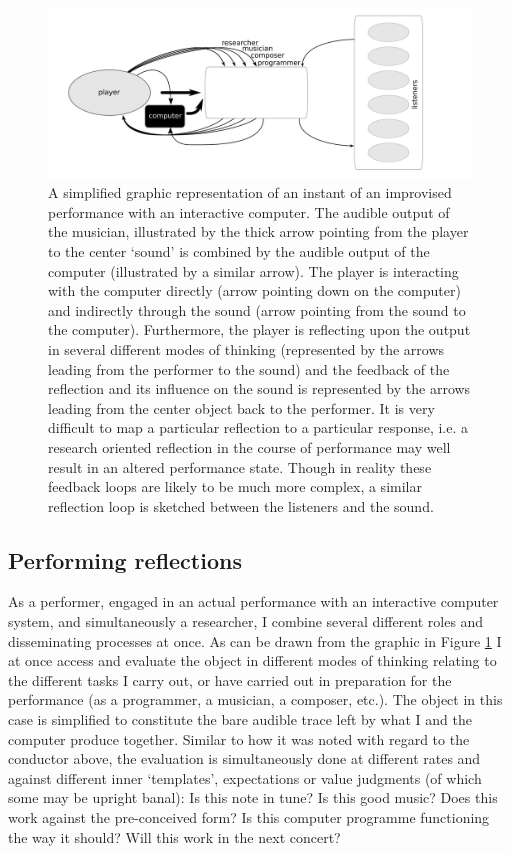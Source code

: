 \begin{figure}[htb]
  \centering
  \includegraphics[width=\linewidth]{img/player-computer}
  \caption{\small{A simplified graphic representation of an instant of an improvised performance with an interactive computer. The audible output of the musician, illustrated by the thick arrow pointing from the player to the center `sound' is combined by the audible output of the computer (illustrated by a similar arrow). The player is interacting with the computer directly (arrow pointing down on the computer) and indirectly through the sound (arrow pointing from the sound to the computer). Furthermore, the player is reflecting upon the output in several different modes of thinking (represented by the arrows leading from the performer to the sound) and the feedback of the reflection and its influence on the sound is represented by the arrows leading from the center object back to the performer. It is very difficult to map a particular reflection to a particular response, i.e. a research oriented reflection in the course of performance may well result in an altered performance state. Though in reality these feedback loops are likely to be much more complex, a similar reflection loop is sketched between the listeners and the sound. }}
  \label{fig:player-comp}
\end{figure}

\subsection*{Performing reflections}
\label{sec:perf-refl}

As a performer, engaged in an actual performance with an interactive computer system, and simultaneously a researcher, I combine several different roles and disseminating processes at once. As can be drawn from the graphic in Figure \ref{fig:player-comp} I at once access and evaluate the object in different modes of thinking relating to the different tasks I carry out, or have carried out in preparation for the performance (as a programmer, a musician, a composer, etc.). The object in this case is simplified to constitute the bare audible trace left by what I and the computer produce together. Similar to how it was noted with regard to the conductor above, the evaluation is simultaneously done at different rates and against different inner `templates', expectations or value judgments (of which some may be upright banal): Is this note in tune? Is this good music? Does this work against the pre-conceived form? Is this computer programme functioning the way it should? Will this work in the next concert? 

